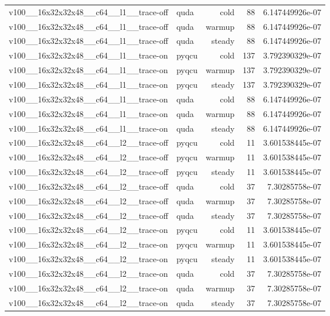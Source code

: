 \begin{table}[htbp]
\begin{tabular}{@{}llrrr@{}}
v100\_\_16x32x32x48\_\_c64\_\_l1\_\_trace-off & quda & cold & 88 & 6.147449926e-07 \\
v100\_\_16x32x32x48\_\_c64\_\_l1\_\_trace-off & quda & warmup & 88 & 6.147449926e-07 \\
v100\_\_16x32x32x48\_\_c64\_\_l1\_\_trace-off & quda & steady & 88 & 6.147449926e-07 \\
v100\_\_16x32x32x48\_\_c64\_\_l1\_\_trace-on & pyqcu & cold & 137 & 3.792390329e-07 \\
v100\_\_16x32x32x48\_\_c64\_\_l1\_\_trace-on & pyqcu & warmup & 137 & 3.792390329e-07 \\
v100\_\_16x32x32x48\_\_c64\_\_l1\_\_trace-on & pyqcu & steady & 137 & 3.792390329e-07 \\
v100\_\_16x32x32x48\_\_c64\_\_l1\_\_trace-on & quda & cold & 88 & 6.147449926e-07 \\
v100\_\_16x32x32x48\_\_c64\_\_l1\_\_trace-on & quda & warmup & 88 & 6.147449926e-07 \\
v100\_\_16x32x32x48\_\_c64\_\_l1\_\_trace-on & quda & steady & 88 & 6.147449926e-07 \\
v100\_\_16x32x32x48\_\_c64\_\_l2\_\_trace-off & pyqcu & cold & 11 & 3.601538445e-07 \\
v100\_\_16x32x32x48\_\_c64\_\_l2\_\_trace-off & pyqcu & warmup & 11 & 3.601538445e-07 \\
v100\_\_16x32x32x48\_\_c64\_\_l2\_\_trace-off & pyqcu & steady & 11 & 3.601538445e-07 \\
v100\_\_16x32x32x48\_\_c64\_\_l2\_\_trace-off & quda & cold & 37 & 7.30285758e-07 \\
v100\_\_16x32x32x48\_\_c64\_\_l2\_\_trace-off & quda & warmup & 37 & 7.30285758e-07 \\
v100\_\_16x32x32x48\_\_c64\_\_l2\_\_trace-off & quda & steady & 37 & 7.30285758e-07 \\
v100\_\_16x32x32x48\_\_c64\_\_l2\_\_trace-on & pyqcu & cold & 11 & 3.601538445e-07 \\
v100\_\_16x32x32x48\_\_c64\_\_l2\_\_trace-on & pyqcu & warmup & 11 & 3.601538445e-07 \\
v100\_\_16x32x32x48\_\_c64\_\_l2\_\_trace-on & pyqcu & steady & 11 & 3.601538445e-07 \\
v100\_\_16x32x32x48\_\_c64\_\_l2\_\_trace-on & quda & cold & 37 & 7.30285758e-07 \\
v100\_\_16x32x32x48\_\_c64\_\_l2\_\_trace-on & quda & warmup & 37 & 7.30285758e-07 \\
v100\_\_16x32x32x48\_\_c64\_\_l2\_\_trace-on & quda & steady & 37 & 7.30285758e-07 \\

\end{tabular}
\end{table}
